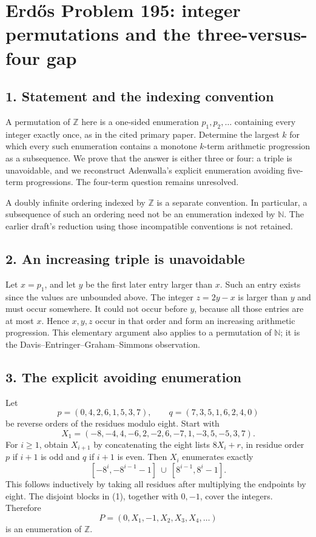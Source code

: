 \section*{Erd\H{o}s Problem 195: integer permutations and the three-versus-four gap}

\subsection*{1. Statement and the indexing convention}
A permutation of $\mathbb Z$ here is a one-sided enumeration $p_1,p_2,\ldots$ containing every integer exactly once, as in the cited primary paper. Determine the largest $k$ for which every such enumeration contains a monotone $k$-term arithmetic progression as a subsequence. We prove that the answer is either three or four: a triple is unavoidable, and we reconstruct Adenwalla's explicit enumeration avoiding five-term progressions. The four-term question remains unresolved.

A doubly infinite ordering indexed by $\mathbb Z$ is a separate convention. In particular, a subsequence of such an ordering need not be an enumeration indexed by $\mathbb N$. The earlier draft's reduction using those incompatible conventions is not retained.

\subsection*{2. An increasing triple is unavoidable}
Let $x=p_1$, and let $y$ be the first later entry larger than $x$. Such an entry exists since the values are unbounded above. The integer $z=2y-x$ is larger than $y$ and must occur somewhere. It could not occur before $y$, because all those entries are at most $x$. Hence $x,y,z$ occur in that order and form an increasing arithmetic progression. This elementary argument also applies to a permutation of $\mathbb N$; it is the Davis--Entringer--Graham--Simmons observation.

\subsection*{3. The explicit avoiding enumeration}
Let
\[
 p=(0,4,2,6,1,5,3,7),\qquad q=(7,3,5,1,6,2,4,0)
\]
be reverse orders of the residues modulo eight. Start with
\[
 X_1=(-8,-4,4,-6,2,-2,6,-7,1,-3,5,-5,3,7).
\]
For $i\ge1$, obtain $X_{i+1}$ by concatenating the eight lists $8X_i+r$, in residue order $p$ if $i+1$ is odd and $q$ if $i+1$ is even. Then $X_i$ enumerates exactly
\[
 [-8^i,-8^{i-1}-1]\ \cup\ [8^{i-1},8^i-1].\tag{1}
\]
This follows inductively by taking all residues after multiplying the endpoints by eight. The disjoint blocks in (1), together with $0,-1$, cover the integers. Therefore
\[
 P=(0,X_1,-1,X_2,X_3,X_4,\ldots)\tag{2}
\]
is an enumeration of $\mathbb Z$.

